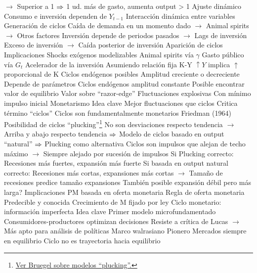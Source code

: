 \documentclass{nuevotema}
\begin{document}
\begin{esquemal}
				\4[] $\to$ Superior a 1
				\4[] $\then$ 1 ud. más de gasto, aumenta output > 1
				\4 Ajuste dinámico
				\4[] Consumo e inversión dependen de $Y_{t-1}$
				\4[$\then$] Interacción dinámica entre variables
				\4 Generación de ciclos
				\4[] Caída de demanda en un momento dado
				\4[] $\to$ Animal spirits
				\4[] $\to$ Otros factores
				\4[] Inversión depende de periodos pasados
				\4[] $\to$ Lags de inversión
				\4[] Exceso de inversión
				\4[] $\to$ Caída posterior de inversión
				\4[$\then$] Aparición de ciclos
			\3 Implicaciones
				\4 Shocks exógenos modelizables
				\4[] Animal spirits vía $\gamma$
				\4[] Gasto público vía $G_t$
				\4 Acelerador de la inversión
				\4[] Asumiendo relación fija K-Y
				\4[] $\uparrow Y$ implica $\uparrow$ proporcional de K
				\4 Ciclos endógenos posibles
				\4[] Amplitud creciente o decreciente
				\4[] Depende de parámetros
				\4 Ciclos endógenos amplitud constante
				\4[] Posible encontrar valor de equilibrio
				\4[] Valor sobre ``razor-edge''
				\4 Fluctuaciones explosivas
				\4[] Con mínimo impulso inicial
		\2 Monetarismo
			\3 Idea clave
				\4 Mejor fluctuaciones que ciclos
				\4[] Critica término ``ciclos''
				\4 Ciclos son fundamentalmente monetarios
				\4 Friedman (1964) Posibilidad de ciclos ``plucking''\footnote{\href{https://www.bruegel.org/2015/02/the-plucking-model-of-recessions-and-recoveries/}{Ver Bruegel sobre modelos ``plucking''.}}
				\4[] No son desviaciones respecto tendencia
				\4[] $\to$ Arriba y abajo respecto tendencia
				\4[] $\then$ Modelo de ciclos basado en output ``natural''
				\4[] $\then$ Plucking como alternativa
				\4[] Ciclos son impulsos que alejan de techo máximo
				\4[] $\to$ Siempre alejado por sucesión de impulsos
				\4[$\then$] Si Plucking correcto:
				\4[] Recesiones más fuertes, expansión más fuerte
				\4[$\then$] Si basada en output natural correcto:
				\4[] Recesiones más cortas, expansiones más cortas
				\4[] $\to$ Tamaño de recesiones predice tamaño expansiones
				\4[] También posible expansión débil pero más larga?
			\3 Implicaciones
				\4 PM basada en oferta monetaria
				\4 Regla de oferta monetaria
				\4[] Predecible y conocida
				\4[] Crecimiento de M fijado por ley
		\2 Ciclo monetario: información imperfecta
			\3 Idea clave
				\4 Primer modelo microfundamentado
				\4[] Consumidores-productores optimizan decisiones
				\4[] Resiste a crítica de Lucas
				\4[] $\to$ Más apto para análisis de políticas
				\4 Marco walrasiano
				\4[] Pionero
				\4[] Mercados siempre en equilibrio
				\4[] Ciclo no es trayectoria hacia equilibrio

\end{esquemal}
\end{document}
